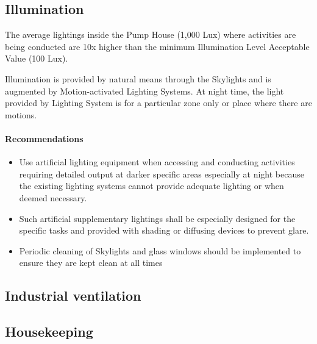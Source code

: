 \subsection{Illumination}\label{ch05aq03}
The average lightings inside the Pump House (1,000 Lux) where activities are being conducted are 10x higher than the minimum Illumination Level Acceptable Value (100 Lux).

Illumination is provided by natural means through the Skylights and is augmented by Motion-activated Lighting Systems. At night time, the light provided by Lighting System is for a particular zone only or place where there are motions.

\paragraph{\textbf{Recommendations}}

\begin{itemize}
\item	Use artificial lighting equipment when accessing and conducting activities requiring detailed output at darker specific areas especially at night because the existing lighting systems cannot provide adequate lighting or when deemed necessary.
\item	Such artificial supplementary lightings shall be especially designed for the specific tasks and provided with shading or diffusing devices to prevent glare.
\item	Periodic cleaning of Skylights and glass windows should be implemented to ensure they are kept clean at all times

\end{itemize}


\subsection{Industrial ventilation}\label{ch05aq04}
\subsection{Housekeeping}\label{ch05aq05}
